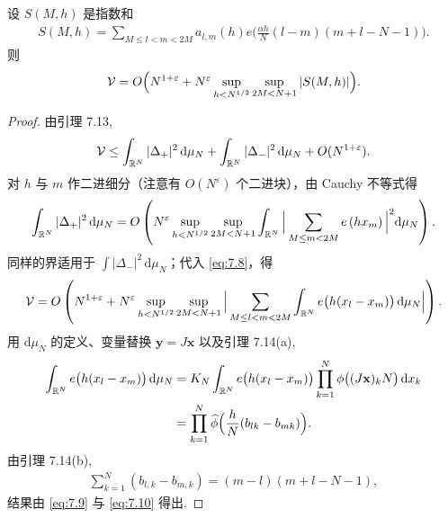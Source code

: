 \begin{proposition}\label{prop:7.17}
设 $S(M, h)$ 是指数和
\begin{align*}
  S(M,h)=\sum_{M\leq l<m<2M}a_{l,m}(h)e\Big(\frac{\alpha h}{N}(l-m)(m+l-N-1)\Big).
\end{align*}
则
\begin{equation}\label{eq:7.8}
  \mathcal{V}=O\Bigl(N^{1+\varepsilon}
  +N^{\varepsilon}\sup_{h<N^{1/2}}\sup_{2M<N+1}|S(M,h)|\Bigr).
\end{equation}
\end{proposition}

\begin{proof}
由引理 7.13,
\begin{align*}
  \mathcal{V}\leq\int_{\mathbb{R}^{N}}|\Delta_{+}|^{2}\,\mathrm{d}\mu_{N}
  +\int_{\mathbb{R}^{N}}|\Delta_{-}|^{2}\,\mathrm{d}\mu_{N}+O(N^{1+\varepsilon}).
\end{align*}
对 $h$ 与 $m$ 作二进细分（注意有 $O(N^{\varepsilon})$ 个二进块），由 Cauchy 不等式得
\begin{equation}\label{eq:7.9}
  \int_{\mathbb{R}^{N}}|\Delta_{+}|^{2}\,\mathrm{d}\mu_{N}
  =O\left(N^{\varepsilon}\sup_{h<N^{1/2}}\sup_{2M<N+1}
  \int_{\mathbb{R}^{N}}\Big|\sum_{M\leq m<2M}e\left(h x_{m}\right)\Big|^{2}\mathrm{d}\mu_{N}\right).
\end{equation}
同样的界适用于 $\int|\Delta_{-}|^{2}\,\mathrm{d}\mu_{N}$；代入 \eqref{eq:7.8}，得
\begin{align*}
  \mathcal{V}=O\left(N^{1+\varepsilon}+N^{\varepsilon}\sup_{h<N^{1/2}}\sup_{2M<N+1}
  \Big|\sum_{M\leq l<m<2M}\int_{\mathbb{R}^{N}}e\bigl(h(x_{l}-x_{m})\bigr)\,\mathrm{d}\mu_{N}\Big|\right).
\end{align*}
用 $\mathrm{d}\mu_N$ 的定义、变量替换 $\mathbf{y} = J\mathbf{x}$ 以及引理 7.14(a),
\begin{equation}\label{eq:7.10}
  \begin{aligned}
  \int_{\mathbb{R}^{N}}e\bigl(h(x_{l}-x_{m})\bigr)\,\mathrm{d}\mu_{N}
  &=K_{N}\int_{\mathbb{R}^{N}}e\bigl(h(x_{l}-x_{m})\bigr)
   \prod_{k=1}^{N}\phi\bigl((J\mathbf{x})_{k}N\bigr)\,\mathrm{d}x_{k}\\
  &=\prod_{k=1}^{N}\widehat{\phi}\Big(\frac{h}{N}(b_{lk}-b_{mk})\Big).
  \end{aligned}
\end{equation}
由引理 7.14(b),
\begin{align*}
  \sum_{k=1}^{N}(b_{l,k}-b_{m,k})=(m-l)(m+l-N-1),
\end{align*}
结果由 \eqref{eq:7.9} 与 \eqref{eq:7.10} 得出.
\end{proof}

